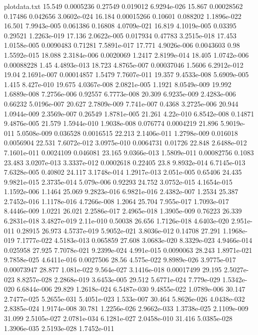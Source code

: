 \begin{filecontents*}{plotdata.txt}
15.549	0.0005236	0.27549	0.019012	6.9294e-026
15.867	0.00028562	0.17486	0.042656	3.0602e-024
16.184	0.00015266	0.10601	0.088202	1.1896e-022
16.501	7.9943e-005	0.061386	0.16808	4.0709e-021
16.819	4.1019e-005	0.03395	0.29521	1.2263e-019
17.136	2.0622e-005	0.017934	0.47783	3.2515e-018
17.453	1.0158e-005	0.0090483	0.71281	7.5891e-017
17.771	4.9026e-006	0.0043603	0.98	1.5592e-015
18.088	2.3184e-006	0.0020069	1.2417	2.8199e-014
18.405	1.0742e-006	0.00088228	1.45	4.4893e-013
18.723	4.8765e-007	0.00037046	1.5606	6.2912e-012
19.04	2.1691e-007	0.00014857	1.5479	7.7607e-011
19.357	9.4533e-008	5.6909e-005	1.415	8.427e-010
19.675	4.0367e-008	2.0821e-005	1.1921	8.0549e-009
19.992	1.6889e-008	7.2756e-006	0.92557	6.7773e-008
20.309	6.9235e-009	2.4283e-006	0.66232	5.0196e-007
20.627	2.7809e-009	7.741e-007	0.4368	3.2725e-006
20.944	1.0944e-009	2.3569e-007	0.26549	1.8781e-005
21.261	4.22e-010	6.8542e-008	0.14871	9.4876e-005
21.579	1.5944e-010	1.9038e-008	0.076774	0.0004219
21.896	5.9019e-011	5.0508e-009	0.036528	0.0016515
22.213	2.1406e-011	1.2798e-009	0.016018	0.0056904
22.531	7.6072e-012	3.0975e-010	0.0064731	0.01726
22.848	2.6488e-012	7.1601e-011	0.0024109	0.046081
23.165	9.0366e-013	1.5809e-011	0.00082756	0.1083
23.483	3.0207e-013	3.3337e-012	0.0002618	0.22405
23.8	9.8932e-014	6.7145e-013	7.6328e-005	0.40802
24.117	3.1748e-014	1.2917e-013	2.051e-005	0.65406
24.435	9.9821e-015	2.3735e-014	5.079e-006	0.92293
24.752	3.0752e-015	4.1654e-015	1.1592e-006	1.1464
25.069	9.2823e-016	6.9821e-016	2.4382e-007	1.2534
25.387	2.7452e-016	1.1178e-016	4.7266e-008	1.2064
25.704	7.955e-017	1.7093e-017	8.4446e-009	1.0221
26.021	2.2586e-017	2.4965e-018	1.3905e-009	0.76223
26.339	6.2831e-018	3.4827e-019	2.11e-010	0.50038
26.656	1.7126e-018	4.6403e-020	2.951e-011	0.28915
26.973	4.5737e-019	5.9052e-021	3.8036e-012	0.14708
27.291	1.1968e-019	7.1777e-022	4.5183e-013	0.065859
27.608	3.0683e-020	8.3329e-023	4.9466e-014	0.025958
27.925	7.7078e-021	9.2399e-024	4.991e-015	0.0090063
28.243	1.8971e-021	9.7858e-025	4.6411e-016	0.0027506
28.56	4.575e-022	9.8989e-026	3.9775e-017	0.00073947
28.877	1.081e-022	9.564e-027	3.1416e-018	0.00017499
29.195	2.5027e-023	8.8257e-028	2.2868e-019	3.6453e-005
29.512	5.6771e-024	7.779e-029	1.5342e-020	6.6844e-006
29.829	1.2618e-024	6.5487e-030	9.4855e-022	1.0789e-006
30.147	2.7477e-025	5.2655e-031	5.4051e-023	1.533e-007
30.464	5.8626e-026	4.0438e-032	2.8385e-024	1.9174e-008
30.781	1.2256e-026	2.9662e-033	1.3738e-025	2.1109e-009
31.099	2.5105e-027	2.0781e-034	6.1281e-027	2.0458e-010
31.416	5.0385e-028	1.3906e-035	2.5193e-028	1.7452e-011
\end{filecontents*}

